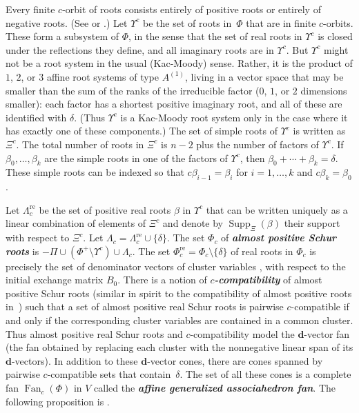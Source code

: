 \documentclass{amsart}
\theoremstyle{definition}
\theoremstyle{remark}
\numberwithin{equation}{section}
\newcommand{\newword}[1]{\textbf{\emph{#1}}}
\newcommand{\set}[1]{{\lbrace #1 \rbrace}}
\newcommand{\0}{{\mathbf{0}}}
\newcommand{\Fan}{\operatorname{Fan}}
\newcommand{\re}{\mathrm{re}}
\newcommand{\dd}{{\mathbf d}}
\newcommand{\RSChar}{\Phi}
\newcommand{\RS}{\RSChar}
\newcommand{\RSpos}{\RS^+}
\newcommand{\SimplesChar}{\Pi}
\newcommand{\Simples}{\SimplesChar}
\newcommand{\RSTChar}{\Upsilon}
\newcommand{\RST}[1]{\RSTChar^{#1}}
\newcommand{\SimplesTChar}{\Xi}
\newcommand{\SimplesT}[1]{\SimplesTChar^{#1}}
\newcommand{\SuppT}{\operatorname{Supp}_\SimplesTChar}
\newcommand{\AP}[1]{\RS_{#1}}
\newcommand{\APre}[1]{\AP{#1}^\re}
\newcommand{\APTChar}{\Lambda}
\newcommand{\APT}[1]{\APTChar_{#1}}
\newcommand{\APTre}[1]{\APT{#1}^\re}
\newcommand{\afftype}[1]{{#1^{(1)}}}
\begin{document}
Every finite $c$-orbit of roots consists entirely of positive roots or entirely of negative roots.
(See \cite[Chapter~1]{Dlab-Ringel} or \cite[Theorem~1.2(5)]{afforb}.)
Let $\RST{c}$ be the set of roots in~$\RS$ that are in finite $c$-orbits.
These form a subsystem of $\RS$, in the sense that the set of real roots in $\RST{c}$ is closed under the reflections they define, and all imaginary roots are in $\RST{c}$.
But $\RST{c}$ might not be a root system in the usual (Kac-Moody) sense.
Rather, it is the product of $1$, $2$, or $3$ affine root systems of type $\afftype{A}$, living in a vector space that may be smaller than the sum of the ranks of the irreducible factor ($0$, $1$, or $2$ dimensions smaller):
each factor has a shortest positive imaginary root, and all of these are identified with $\delta$.
(Thus $\RST{c}$ is a Kac-Moody root system only in the case where it has exactly one of these components.)
The set of simple roots of $\RST{c}$ is written as $\SimplesT{c}$.
The total number of roots in $\SimplesT{c}$ is $n-2$ plus the number of factors of $\RST{c}$.
If $\beta_0,\ldots,\beta_k$ are the simple roots in one of the factors of $\RST{c}$, then $\beta_0+\cdots+\beta_k=\delta$.
These simple roots can be indexed so that $c\beta_{i-1}=\beta_i$ for $i=1,\ldots,k$ and $c\beta_k=\beta_0$.


Let $\APTre{c}$ be the set of positive real roots $\beta$ in $\RST{c}$ that can be written uniquely as a linear combination of elements of $\SimplesT{c}$ and denote by $\SuppT(\beta)$ their support with respect to $\SimplesT{c}$.
Let $\APT{c}=\APTre{c}\cup\set\delta$. 
The set $\AP{c}$ of \newword{almost positive Schur roots} is ${-\Simples\cup(\RSpos\setminus\RST{c})\cup\APT{c}}$.
The set $\APre{c}=\AP{c}\setminus\set\delta$ of real roots in $\AP{c}$ is precisely the set of denominator vectors of cluster variables \cite[Theorem~1.2]{affdenom}, with respect to the initial exchange matrix $B_0$.
There is a notion \cite[Definition~4.3]{affdenom} of \newword{$c$-compatibility} of almost positive Schur roots (similar in spirit to the compatibility of almost positive roots in~\cite{ga}) such that a set of almost positive real Schur roots is pairwise $c$-compatible if and only if the corresponding cluster variables are contained in a common cluster.
Thus almost positive real Schur roots and $c$-compatibility model the $\dd$-vector fan (the fan obtained by replacing each cluster with the nonnegative linear span of its $\dd$-vectors).
In addition to these $\dd$-vector cones, there are cones spanned by pairwise $c$-compatible sets that contain~$\delta$.
The set of all these cones is a complete fan $\Fan_c(\RS)$ in $V$ called the \newword{affine generalized associahedron fan}.
The following proposition is \cite[Proposition~5.6]{affdenom}.
\end{document}
